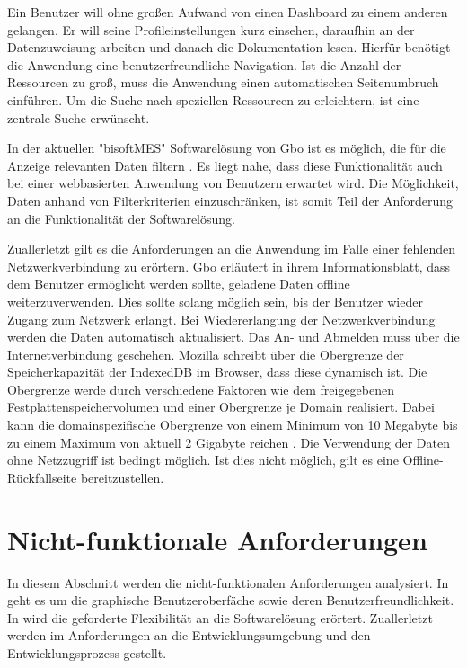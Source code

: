Ein Benutzer will ohne großen Aufwand von einen Dashboard zu einem anderen gelangen. Er will seine Profileinstellungen
kurz einsehen, daraufhin an der Datenzuweisung arbeiten und danach die Dokumentation lesen.
Hierfür benötigt die Anwendung eine benutzerfreundliche Navigation. Ist die Anzahl der Ressourcen zu 
groß, muss die Anwendung einen automatischen Seitenumbruch einführen. Um die Suche nach speziellen
Ressourcen zu erleichtern, ist eine zentrale Suche erwünscht.

In der aktuellen "bisoftMES" Softwarelösung von Gbo ist es möglich, die für die Anzeige relevanten Daten filtern \cite[S. 14]{BisoftMESHandbuch}.
Es liegt nahe, dass diese Funktionalität auch bei einer webbasierten Anwendung von Benutzern erwartet wird. Die Möglichkeit, Daten
anhand von Filterkriterien einzuschränken, ist somit Teil der Anforderung an die Funktionalität der Softwarelösung.

Zuallerletzt gilt es die Anforderungen an die Anwendung im Falle einer fehlenden Netzwerkverbindung
zu erörtern. Gbo erläutert in ihrem Informationsblatt, dass dem Benutzer
ermöglicht werden sollte, geladene Daten offline weiterzuverwenden. Dies sollte solang möglich sein,
bis der Benutzer wieder Zugang zum Netzwerk erlangt. Bei Wiedererlangung der Netzwerkverbindung werden
die Daten automatisch aktualisiert. Das An- und Abmelden muss über die Internetverbindung
geschehen. Mozilla schreibt über die Obergrenze der Speicherkapazität der IndexedDB im Browser,
dass diese dynamisch ist. Die Obergrenze werde durch verschiedene Faktoren wie dem freigegebenen
Festplattenspeichervolumen und einer Obergrenze je Domain realisiert. Dabei kann die domainspezifische
Obergrenze von einem Minimum von 10 Megabyte bis zu einem Maximum von aktuell 2 Gigabyte reichen \cite{MozillaStorageLimit}.
Die Verwendung der Daten ohne Netzzugriff ist bedingt möglich. Ist dies nicht möglich, gilt es
eine Offline-Rückfallseite bereitzustellen.

\section{Nicht-funktionale Anforderungen}
\label{sec:nichtfunktionaleanforderungen}
In diesem Abschnitt werden die nicht-funktionalen Anforderungen analysiert.
In  geht es um die graphische Benutzeroberfäche sowie
deren Benutzerfreundlichkeit. In  wird die geforderte
Flexibilität an die Softwarelösung erörtert. Zuallerletzt werden im 
Anforderungen an die Entwicklungsumgebung und den Entwicklungsprozess gestellt.

